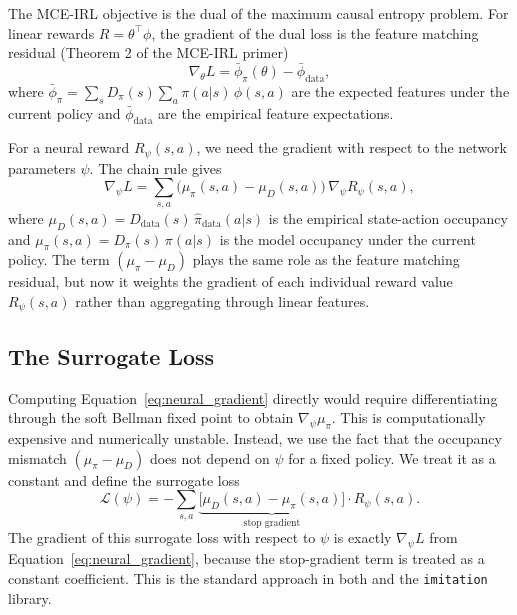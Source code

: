 \documentclass[10pt]{article}
\begin{document}
The MCE-IRL objective is the dual of the maximum causal entropy problem. For linear rewards $R = \theta^\top\phi$, the gradient of the dual loss is the feature matching residual (Theorem 2 of the MCE-IRL primer)
\begin{equation}
\nabla_\theta L = \bar\phi_\pi(\theta) - \bar\phi_{\text{data}},
\end{equation}
where $\bar\phi_\pi = \sum_s D_\pi(s) \sum_a \pi(a|s)\,\phi(s,a)$ are the expected features under the current policy and $\bar\phi_{\text{data}}$ are the empirical feature expectations.

For a neural reward $R_\psi(s,a)$, we need the gradient with respect to the network parameters $\psi$. The chain rule gives
\begin{equation}
\label{eq:neural_gradient}
\nabla_\psi L = \sum_{s,a} \bigl(\mu_\pi(s,a) - \mu_D(s,a)\bigr)\, \nabla_\psi R_\psi(s,a),
\end{equation}
where $\mu_D(s,a) = D_{\text{data}}(s)\,\hat\pi_{\text{data}}(a|s)$ is the empirical state-action occupancy and $\mu_\pi(s,a) = D_\pi(s)\,\pi(a|s)$ is the model occupancy under the current policy. The term $(\mu_\pi - \mu_D)$ plays the same role as the feature matching residual, but now it weights the gradient of each individual reward value $R_\psi(s,a)$ rather than aggregating through linear features.


\subsection{The Surrogate Loss}

Computing Equation~\eqref{eq:neural_gradient} directly would require differentiating through the soft Bellman fixed point to obtain $\nabla_\psi \mu_\pi$. This is computationally expensive and numerically unstable. Instead, we use the fact that the occupancy mismatch $(\mu_\pi - \mu_D)$ does not depend on $\psi$ for a fixed policy. We treat it as a constant and define the surrogate loss
\begin{equation}
\label{eq:surrogate}
\mathcal{L}(\psi) = -\sum_{s,a} \underbrace{\bigl[\mu_D(s,a) - \mu_\pi(s,a)\bigr]}_{\text{stop gradient}} \cdot R_\psi(s,a).
\end{equation}
The gradient of this surrogate loss with respect to $\psi$ is exactly $\nabla_\psi L$ from Equation~\eqref{eq:neural_gradient}, because the stop-gradient term is treated as a constant coefficient. This is the standard approach in both \citet{wulfmeier2016} and the \texttt{imitation} library.
\end{document}
